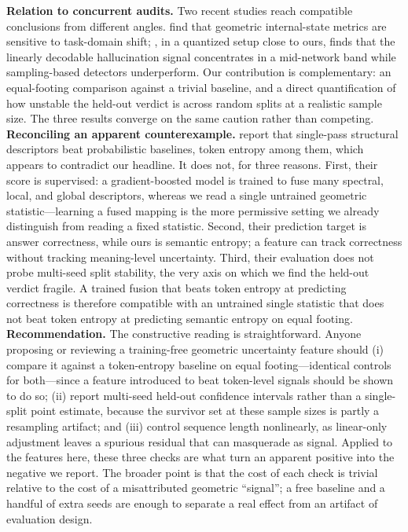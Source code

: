 \documentclass[11pt]{article}
\begin{document}
\textbf{Relation to concurrent audits.} Two recent studies reach compatible conclusions from different angles. \citet{yeats2025what} find that geometric internal-state metrics are sensitive to task-domain shift; \citet{aiersilan2026hallucination}, in a quantized setup close to ours, finds that the linearly decodable hallucination signal concentrates in a mid-network band while sampling-based detectors underperform. Our contribution is complementary: an equal-footing comparison against a trivial baseline, and a direct quantification of how unstable the held-out verdict is across random splits at a realistic sample size. The three results converge on the same caution rather than competing.
\textbf{Reconciling an apparent counterexample.} \citet{yang2026trust} report that single-pass structural descriptors beat probabilistic baselines, token entropy among them, which appears to contradict our headline. It does not, for three reasons. First, their score is supervised: a gradient-boosted model is trained to fuse many spectral, local, and global descriptors, whereas we read a single untrained geometric statistic---learning a fused mapping is the more permissive setting we already distinguish from reading a fixed statistic. Second, their prediction target is answer correctness, while ours is semantic entropy; a feature can track correctness without tracking meaning-level uncertainty. Third, their evaluation does not probe multi-seed split stability, the very axis on which we find the held-out verdict fragile. A trained fusion that beats token entropy at predicting correctness is therefore compatible with an untrained single statistic that does not beat token entropy at predicting semantic entropy on equal footing.
\textbf{Recommendation.} The constructive reading is straightforward. Anyone proposing or reviewing a training-free geometric uncertainty feature should (i) compare it against a token-entropy baseline on equal footing---identical controls for both---since a feature introduced to beat token-level signals should be shown to do so; (ii) report multi-seed held-out confidence intervals rather than a single-split point estimate, because the survivor set at these sample sizes is partly a resampling artifact; and (iii) control sequence length nonlinearly, as linear-only adjustment leaves a spurious residual that can masquerade as signal. Applied to the features here, these three checks are what turn an apparent positive into the negative we report. The broader point is that the cost of each check is trivial relative to the cost of a misattributed geometric ``signal''; a free baseline and a handful of extra seeds are enough to separate a real effect from an artifact of evaluation design.
\end{document}
